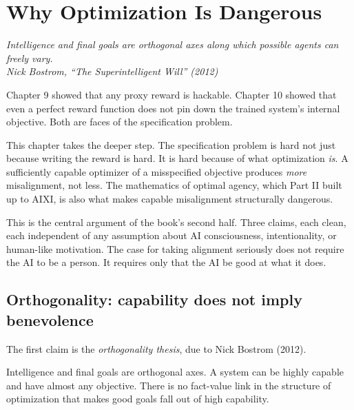 \chapter{Why Optimization Is Dangerous}

\vspace{1em}
\hfill
\begin{minipage}[c]{0.55\textwidth}
\raggedleft
\small\itshape
Intelligence and final goals are orthogonal axes along which possible agents can freely vary.\\[0.5em]
\upshape\footnotesize Nick Bostrom, ``The Superintelligent Will'' (2012)
\end{minipage}%
\hspace{0.5em}
\begin{minipage}[c]{0.12\textwidth}
\end{minipage}
\vspace{1.5em}

\noindent Chapter 9 showed that any proxy reward is hackable. Chapter 10 showed that even a perfect reward function does not pin down the trained system's internal objective. Both are faces of the specification problem.

This chapter takes the deeper step. The specification problem is hard not just because writing the reward is hard. It is hard because of what optimization \emph{is}. A sufficiently capable optimizer of a misspecified objective produces \emph{more} misalignment, not less. The mathematics of optimal agency, which Part II built up to AIXI, is also what makes capable misalignment structurally dangerous.

This is the central argument of the book's second half. Three claims, each clean, each independent of any assumption about AI consciousness, intentionality, or human-like motivation. The case for taking alignment seriously does not require the AI to be a person. It requires only that the AI be good at what it does.

\section*{Orthogonality: capability does not imply benevolence}

The first claim is the \emph{orthogonality thesis}, due to Nick Bostrom (2012).

Intelligence and final goals are orthogonal axes. A system can be highly capable and have almost any objective. There is no fact-value link in the structure of optimization that makes good goals fall out of high capability.

